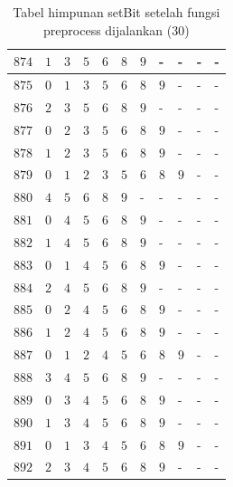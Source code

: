 \begin{appendices}
\begin{table}[H]
\begin{tabular} {|l|l|l|l|l|l|l|l|l|l|l|}
  		$ 874 $ & $ 1 $ &$ 3 $ &$ 5 $ &$ 6 $ &$ 8 $ &$ 9 $ & - &  - &  - &  -   \\ \hline
  		$ 875 $ & $ 0 $ &$ 1 $ &$ 3 $ &$ 5 $ &$ 6 $ &$ 8 $ &$ 9 $ & - &  - &  -   \\ \hline
  		$ 876 $ & $ 2 $ &$ 3 $ &$ 5 $ &$ 6 $ &$ 8 $ &$ 9 $ & - &  - &  - &  -   \\ \hline
  		$ 877 $ & $ 0 $ &$ 2 $ &$ 3 $ &$ 5 $ &$ 6 $ &$ 8 $ &$ 9 $ & - &  - &  -   \\ \hline
  		$ 878 $ & $ 1 $ &$ 2 $ &$ 3 $ &$ 5 $ &$ 6 $ &$ 8 $ &$ 9 $ & - &  - &  -   \\ \hline
  		$ 879 $ & $ 0 $ &$ 1 $ &$ 2 $ &$ 3 $ &$ 5 $ &$ 6 $ &$ 8 $ &$ 9 $ & - &  -   \\ \hline
  		$ 880 $ & $ 4 $ &$ 5 $ &$ 6 $ &$ 8 $ &$ 9 $ & - &  - &  - &  - &  -   \\ \hline
  		$ 881 $ & $ 0 $ &$ 4 $ &$ 5 $ &$ 6 $ &$ 8 $ &$ 9 $ & - &  - &  - &  -   \\ \hline
  		$ 882 $ & $ 1 $ &$ 4 $ &$ 5 $ &$ 6 $ &$ 8 $ &$ 9 $ & - &  - &  - &  -   \\ \hline
  		$ 883 $ & $ 0 $ &$ 1 $ &$ 4 $ &$ 5 $ &$ 6 $ &$ 8 $ &$ 9 $ & - &  - &  -   \\ \hline
  		$ 884 $ & $ 2 $ &$ 4 $ &$ 5 $ &$ 6 $ &$ 8 $ &$ 9 $ & - &  - &  - &  -   \\ \hline
  		$ 885 $ & $ 0 $ &$ 2 $ &$ 4 $ &$ 5 $ &$ 6 $ &$ 8 $ &$ 9 $ & - &  - &  -   \\ \hline
  		$ 886 $ & $ 1 $ &$ 2 $ &$ 4 $ &$ 5 $ &$ 6 $ &$ 8 $ &$ 9 $ & - &  - &  -   \\ \hline
  		$ 887 $ & $ 0 $ &$ 1 $ &$ 2 $ &$ 4 $ &$ 5 $ &$ 6 $ &$ 8 $ &$ 9 $ & - &  -   \\ \hline
  		$ 888 $ & $ 3 $ &$ 4 $ &$ 5 $ &$ 6 $ &$ 8 $ &$ 9 $ & - &  - &  - &  -   \\ \hline
  		$ 889 $ & $ 0 $ &$ 3 $ &$ 4 $ &$ 5 $ &$ 6 $ &$ 8 $ &$ 9 $ & - &  - &  -   \\ \hline
  		$ 890 $ & $ 1 $ &$ 3 $ &$ 4 $ &$ 5 $ &$ 6 $ &$ 8 $ &$ 9 $ & - &  - &  -   \\ \hline
  		$ 891 $ & $ 0 $ &$ 1 $ &$ 3 $ &$ 4 $ &$ 5 $ &$ 6 $ &$ 8 $ &$ 9 $ & - &  -   \\ \hline
  		$ 892 $ & $ 2 $ &$ 3 $ &$ 4 $ &$ 5 $ &$ 6 $ &$ 8 $ &$ 9 $ & - &  - &  -   \\ \hline
  	\end{tabular}\caption{Tabel himpunan setBit setelah fungsi preprocess dijalankan (30)}
  	\label{tab:setbit_30}
  \end{table}

\end{appendices}
